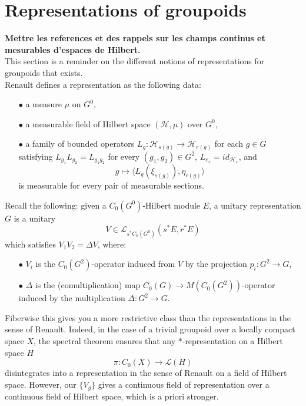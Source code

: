 \section{Representations of groupoids}

\textbf{Mettre les references et des rappels sur les champs continus et mesurables d'espaces de Hilbert.}\\

This section is a reminder on the different notions of representations for groupoids that exists.\\

Renault defines a representation as the following data:\\

\begin{itemize}
\item[$\bullet$] a measure $\mu$ on $G^0$,\\
\item[$\bullet$] a measurable field of Hilbert space $(\mathcal H , \mu)$ over $G^0$,\\
\item[$\bullet$] a family of bounded operators $L_g : \mathcal H_{s(g)} \rightarrow \mathcal H_{r(g)}$ for each $g\in G$ satisfying $L_{g_1} L_{g_2} = L_{g_1 g_2}$ for every $(g_1,g_2)\in G^2$, $L_{e_x}= id_{\mathcal H_x}$, and 
\[g\mapsto \langle L_g(\xi_{s(g)}) , \eta_{r(g)} \rangle \] 
is measurable for every pair of measurable sections. \\
\end{itemize}

Recall the following: given a $C_0(G^0)$-Hilbert module $E$, a unitary representation $G$ is a unitary 
\[V \in\mathcal L_{s^* C_0(G^0)}(s^* E, r^* E)\]
which satisfies $V_1 V_2 = \Delta V$, where:\\

\begin{itemize}
\item[$\bullet$] $V_i $ is the $C_0(G^{2})$-operator induced from $V$ by the projection $p_i : G^2 \rightarrow G$,\\
\item[$\bullet$] $\Delta $ is the (comultiplication) map $C_0(G)\rightarrow M(C_0(G^{2}))$-operator induced by the multiplication $\Delta : G^2 \rightarrow G$.\\
\end{itemize}

Fiberwise this gives you a more restrictive class than the representations in the sense of Renault. Indeed, in the case of a trivial groupoid over a locally compact space $X$, the spectral theorem ensures that any $*$-representation on a Hilbert space $H$
\[\pi : C_0(X) \rightarrow \mathcal L(H)\]
disintegrates into a representation in the sense of Renault on a field of Hilbert space. However, our $\{V_g\}$ gives a continuous field of representation over a continuous field of Hilbert space, which is a priori stronger.\\ 

